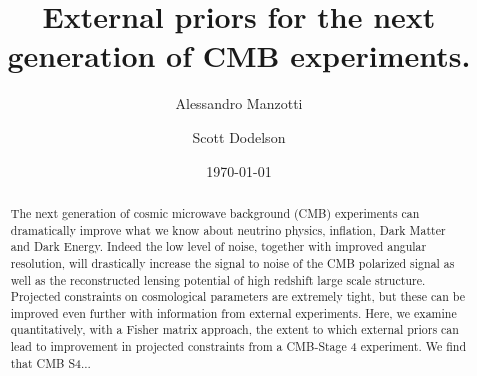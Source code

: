 \documentclass[aps,prd,reprint,superscriptaddress]{revtex4-1}
\begin{document}
\graphicspath{{images/}}

\title{External priors for the next generation of CMB experiments.}

\author{Alessandro Manzotti}
\author{Scott Dodelson}


\date{\today}
\begin{abstract}
The next generation of cosmic microwave background (CMB) experiments can dramatically improve what we know about neutrino physics, inflation, Dark Matter and Dark Energy. 
Indeed the low level of noise, together with improved angular resolution, will drastically increase the signal to noise of the CMB polarized signal as well as the reconstructed lensing potential of high redshift large scale structure. 
Projected constraints on cosmological parameters are extremely tight, but these can be improved even further with information from external experiments. Here, we examine quantitatively, with a Fisher matrix approach, the extent to which external priors can lead to improvement in projected constraints from a CMB-Stage 4 experiment.
We find that CMB S4... 
\end{abstract}

\pacs{}
\maketitle
\end{document}
